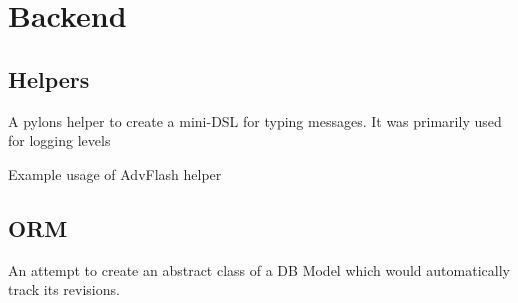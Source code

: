 \section{Backend}


\subsection*{Helpers}
{A pylons helper to create a mini-DSL for typing messages.  It was primarily used for logging levels}

{Example usage of AdvFlash helper}



\subsection*{ORM}

{An attempt to create an abstract class of a DB Model which would automatically track its revisions.}


